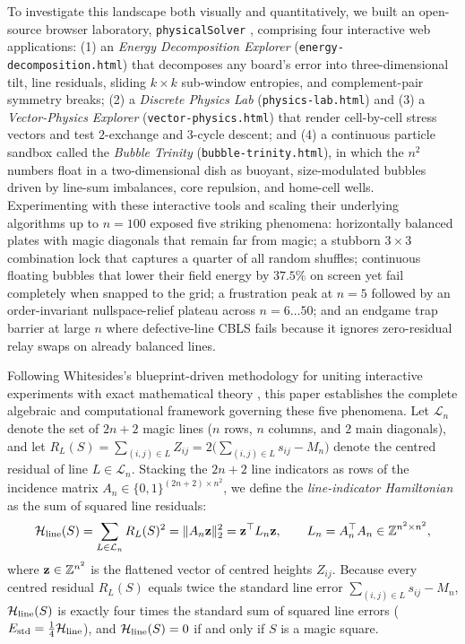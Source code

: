 To investigate this landscape both visually and quantitatively, we built an open-source browser laboratory, \texttt{physicalSolver} \cite{mathewson2026physicalsolver}, comprising four interactive web applications: (1) an \emph{Energy Decomposition Explorer} (\texttt{energy-decomposition.html}) that decomposes any board's error into three-dimensional tilt, line residuals, sliding $k\times k$ sub-window entropies, and complement-pair symmetry breaks; (2) a \emph{Discrete Physics Lab} (\texttt{physics-lab.html}) and (3) a \emph{Vector-Physics Explorer} (\texttt{vector-physics.html}) that render cell-by-cell stress vectors and test $2$-exchange and $3$-cycle descent; and (4) a continuous particle sandbox called the \emph{Bubble Trinity} (\texttt{bubble-trinity.html}), in which the $n^2$ numbers float in a two-dimensional dish as buoyant, size-modulated bubbles driven by line-sum imbalances, core repulsion, and home-cell wells. Experimenting with these interactive tools and scaling their underlying algorithms up to $n = 100$ exposed five striking phenomena: horizontally balanced plates with magic diagonals that remain far from magic; a stubborn $3\times 3$ combination lock that captures a quarter of all random shuffles; continuous floating bubbles that lower their field energy by $37.5\%$ on screen yet fail completely when snapped to the grid; a frustration peak at $n = 5$ followed by an order-invariant nullspace-relief plateau across $n = 6\dots 50$; and an endgame trap barrier at large $n$ where defective-line CBLS fails because it ignores zero-residual relay swaps on already balanced lines.

Following Whitesides's blueprint-driven methodology for uniting interactive experiments with exact mathematical theory \cite{whitesides2004writing}, this paper establishes the complete algebraic and computational framework governing these five phenomena. Let $\mathcal{L}_n$ denote the set of $2n+2$ magic lines ($n$ rows, $n$ columns, and $2$ main diagonals), and let $R_L(S) = \sum_{(i,j)\in L} Z_{ij} = 2\bigl(\sum_{(i,j)\in L} s_{ij} - M_n\bigr)$ denote the centred residual of line $L \in \mathcal{L}_n$. Stacking the $2n+2$ line indicators as rows of the incidence matrix $A_n \in \{0,1\}^{(2n+2)\times n^2}$, we define the \emph{line-indicator Hamiltonian} as the sum of squared line residuals:
\begin{equation}
  \mathcal{H}_{\mathrm{line}}(S) = \sum_{L\in\mathcal{L}_n} R_L(S)^2 = \|A_n \mathbf{z}\|_2^2 = \mathbf{z}^\top L_n \mathbf{z}, \qquad L_n = A_n^\top A_n \in \mathbb{Z}^{n^2 \times n^2},
  \label{eq:hamiltonian_def}
\end{equation}
where $\mathbf{z} \in \mathbb{Z}^{n^2}$ is the flattened vector of centred heights $Z_{ij}$. Because every centred residual $R_L(S)$ equals twice the standard line error $\sum_{(i,j)\in L} s_{ij} - M_n$, $\mathcal{H}_{\mathrm{line}}(S)$ is exactly four times the standard sum of squared line errors ($E_{\mathrm{std}} = \frac{1}{4}\mathcal{H}_{\mathrm{line}}$), and $\mathcal{H}_{\mathrm{line}}(S) = 0$ if and only if $S$ is a magic square.

